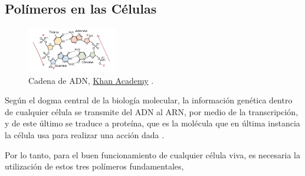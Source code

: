 \documentclass[a4paper,11pt,titlepage]{article}
\theoremstyle{definition}
\begin{document}
\subsection{Polímeros en las Células}\label{subsec:polymers}

\begin{figure}
    \begin{center}
      \includegraphics[width=0.35\textwidth]{images/adn.png}
    \end{center}
    \small{\caption{Cadena de ADN, \href{https://es.khanacademy.org/science/ap-biology/gene-expression-and-regulation/dna-and-rna-structure/a/nucleic-acids}{Khan Academy} \cite{khan}.}\label{fig:adnchain}}\normalsize
\end{figure}

Según el dogma central de la biología molecular, la información genética dentro de cualquier célula se transmite del ADN al ARN, por medio de la transcripción, y de este último se traduce a proteína, que es la molécula que en última instancia la célula usa para realizar una acción dada \cite{alberts}.

Por lo tanto, para el buen funcionamiento de cualquier célula viva, es necesaria la utilización de estos tres polímeros fundamentales,
\end{document}
